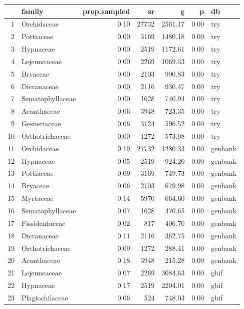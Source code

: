\begin{table}[ht]
\centering
\begin{tabular}{rlrrrrl}
  \hline
 & family & prop.sampled & sr & g & p & db \\ 
  \hline
1 & Orchidaceae & 0.10 & 27732 & 2561.17 & 0.00 & try \\ 
  2 & Pottiaceae & 0.00 & 3169 & 1480.18 & 0.00 & try \\ 
  3 & Hypnaceae & 0.00 & 2519 & 1172.61 & 0.00 & try \\ 
  4 & Lejeuneaceae & 0.00 & 2269 & 1069.33 & 0.00 & try \\ 
  5 & Bryaceae & 0.00 & 2103 & 990.83 & 0.00 & try \\ 
  6 & Dicranaceae & 0.00 & 2116 & 930.47 & 0.00 & try \\ 
  7 & Sematophyllaceae & 0.00 & 1628 & 740.94 & 0.00 & try \\ 
  8 & Acanthaceae & 0.06 & 3948 & 723.35 & 0.00 & try \\ 
  9 & Gesneriaceae & 0.06 & 3124 & 596.52 & 0.00 & try \\ 
  10 & Orthotrichaceae & 0.00 & 1272 & 573.98 & 0.00 & try \\ 
  11 & Orchidaceae & 0.19 & 27732 & 1280.33 & 0.00 & genbank \\ 
  12 & Hypnaceae & 0.05 & 2519 & 924.20 & 0.00 & genbank \\ 
  13 & Pottiaceae & 0.09 & 3169 & 749.73 & 0.00 & genbank \\ 
  14 & Bryaceae & 0.06 & 2103 & 679.98 & 0.00 & genbank \\ 
  15 & Myrtaceae & 0.14 & 5970 & 664.60 & 0.00 & genbank \\ 
  16 & Sematophyllaceae & 0.07 & 1628 & 470.65 & 0.00 & genbank \\ 
  17 & Fissidentaceae & 0.02 & 817 & 406.70 & 0.00 & genbank \\ 
  18 & Dicranaceae & 0.11 & 2116 & 362.75 & 0.00 & genbank \\ 
  19 & Orthotrichaceae & 0.09 & 1272 & 288.41 & 0.00 & genbank \\ 
  20 & Acanthaceae & 0.18 & 3948 & 215.28 & 0.00 & genbank \\ 
  21 & Lejeuneaceae & 0.07 & 2269 & 3084.63 & 0.00 & gbif \\ 
  22 & Hypnaceae & 0.17 & 2519 & 2204.01 & 0.00 & gbif \\ 
  23 & Plagiochilaceae & 0.06 & 524 & 748.03 & 0.00 & gbif \\ 

\end{tabular}
\end{table}
